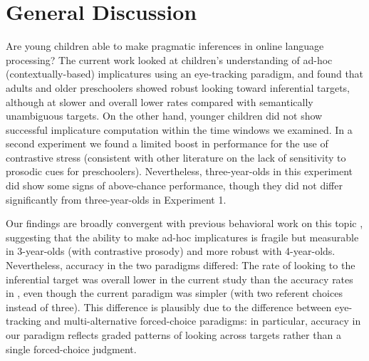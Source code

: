 \documentclass[10pt,letterpaper]{article}
\begin{document}

\section{General Discussion}

Are young children able to make pragmatic inferences in online language processing? The current work looked at children's understanding of ad-hoc (contextually-based) implicatures using an eye-tracking paradigm, and found that adults and older preschoolers showed robust looking toward inferential targets, although at slower and overall lower rates compared with semantically unambiguous targets. On the other hand, younger children did not show successful implicature computation within the time windows we examined. In a second experiment we found a limited boost in performance for the use of contrastive stress (consistent with other literature on the lack of sensitivity to prosodic cues for preschoolers). Nevertheless, three-year-olds in this experiment did show some signs of above-chance performance, though they did not differ significantly from three-year-olds in Experiment 1.  

Our findings are broadly convergent with previous behavioral work on this topic \cite{stillerLLD}, suggesting that the ability to make ad-hoc implicatures is fragile but measurable in 3-year-olds (with contrastive prosody) and more robust with 4-year-olds. Nevertheless, accuracy in the two paradigms differed: The rate of looking to the inferential target was overall lower in the current study than the accuracy rates in , even though the current paradigm was simpler (with two referent choices instead of three). This difference is plausibly due to the difference between eye-tracking and multi-alternative forced-choice paradigms: in particular, accuracy in our paradigm reflects graded patterns of looking across targets rather than a single forced-choice judgment.
\end{document}
